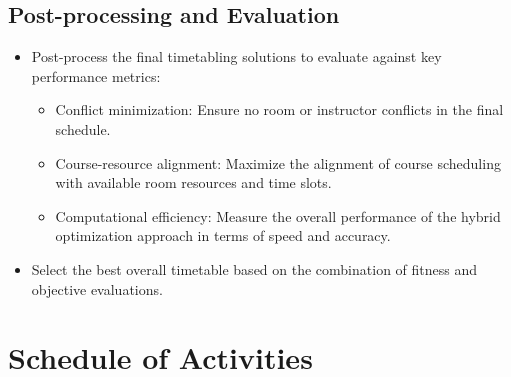 \documentclass{article}
\begin{document}
\subsection{Post-processing and Evaluation}
\label{subsec
} \begin{itemize} \item Post-process the final timetabling solutions to evaluate against key performance metrics: \begin{itemize} \item Conflict minimization: Ensure no room or instructor conflicts in the final schedule. \item Course-resource alignment: Maximize the alignment of course scheduling with available room resources and time slots. \item Computational efficiency: Measure the overall performance of the hybrid optimization approach in terms of speed and accuracy. \end{itemize} \item Select the best overall timetable based on the combination of fitness and objective evaluations. 
\end{itemize}

\section{Schedule of Activities}
\label{sec:schedule}



\printbibliography 
\end{document}

